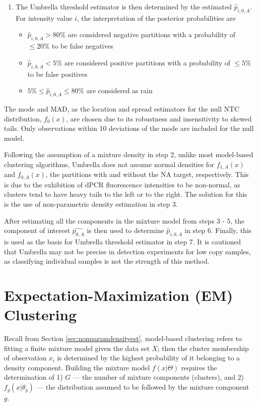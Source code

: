 \begin{enumerate}
    \item The Umbrella threshold estimator is then determined by the estimated \(\hat{p}_{i,0,A}\). For intensity value \(i\), the interpretation of the posterior probabilities are 
    \begin{itemize}
        \item \(\hat{p}_{i,0,A} > 80\%\) are considered negative partitions with a probability of \(\leq20\%\) to be false negatives
        \item \(\hat{p}_{i,0,A} < 5\%\) are considered positive partitions with a probability of \(\leq5\%\) to be false positives
        \item \(5\% \leq \hat{p}_{i,0,A} \leq 80\%\) are considered as rain
    \end{itemize}
\end{enumerate}


The mode and MAD, as the location and spread estimators for the null NTC distribution, \(f_{0}(x)\), are chosen due to its robustness and insensitivity to skewed tails. Only observations within 10 deviations of the mode are included for the null model.

Following the assumption of a mixture density in step 2, unlike most model-based clustering algorithms, Umbrella does not assume normal densities for \(f_{1,A}(x)\) and \(f_{0,A}(x)\), the partitions with and without the NA target, respectively. This is due to the exhibition of dPCR fluorescence intensities to be non-normal, as clusters tend to have heavy tails to the left or to the right. The solution for this is the use of non-parametric density estimation in step 3.

After estimating all the components in the mixture model from steps 3 - 5, the component of interest \(\hat{p_{0,A}}\) is then used to determine \(\hat{p}_{i,0,A}\) in step 6. Finally, this is used as the basis for Umbrella threshold estimator in step 7. It is cautioned that Umbrella may not be precise in detection experiments for low copy samples, as classifying individual samples is not the strength of this method.

\section{Expectation-Maximization (EM) Clustering}
\label{sec:emclustering}

Recall from Section \ref{sec:nonparamdensityest}, model-based clustering refers to fitting a finite mixture model given the data set \(X\); then the cluster membership of observation \(x_i\) is determined by the highest probability of it belonging to a density component. Building the mixture model \(f(x|\Theta)\) requires the determination of 1) \(G\) — the number of mixture components (clusters), and 2) \(f_g(x|\theta_g)\) — the distribution assumed to be followed by the mixture component \(g\). 

